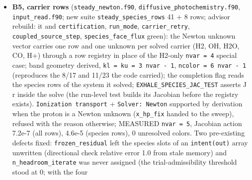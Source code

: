 \documentclass[english,a4paper]{my_memo}
\begin{document}
\begin{itemize}
  lines, b1a 127, b1 64, b3b 24, a2 7, a0 5, b3a 5, b4 2) re-anchored to
  file + routine, declaration or labeled comment block, read against the
  live tree; the step tables of d0 6.1 and b1 7.1 index by the \texttt{as\_op\_*}
  operation tag of \texttt{attempted\_step.f90}; the convention is stated in each
  document. Citations of removed code (the composition projection, the
  two-iteration energy update, the CO ceiling, the cell-velocity carrier
  advection, the element advective term, DB96 eq. (39), the H3+ clamp, the
  second H2 partition function) kept as dated records naming the removing
  item. Stale values corrected in passing: \texttt{e\_lw\_photon\_erg} 1.88021e-11 erg
  (11.7354 eV) over 912-1201 A, \texttt{binary\_element\_diffusion.f90} 3037 lines,
  a2 section 1\textquotesingle s chemical count now passed by the marching caller. All 190
  names introduced grepped present in \texttt{src/}. Recorded: pre-existing
  markdown table pipe misalignments (unescaped \texttt{\textbar{}} in math) in a2, b4,
  code\_status, d0; two markdown line citations of
  \texttt{grid\_and\_gates/README.md} left.
\item
  \textbf{B5, carrier rows} (\texttt{steady\_newton.f90}, \texttt{diffusive\_photochemistry.f90},
  \texttt{input\_read.f90}; new suite \texttt{steady\_species\_rows} 41 + 8 rows; advisor
  rebuild: it and \texttt{certification}, \texttt{run\_mode}, \texttt{carrier\_retry},
  \texttt{coupled\_source\_step}, \texttt{species\_face\_flux} green): the Newton unknown
  vector carries one row and one unknown per solved carrier (H2, OH, H2O,
  CO, H+) through a row registry in place of the H2-only \texttt{nvar\ =\ 4} special
  case; band geometry derived, \texttt{kl\ =\ ku\ =\ 3\ nvar\ -\ 1}, \texttt{ncolor\ =\ 6\ nvar\ -\ 1}
  (reproduces the 8/17 and 11/23 the code carried); the completion flag
  reads the species rows of the system it solved; \texttt{EXHALE\_SPECIES\_JAC\_TEST}
  asserts J r inside the solve (the run-level test builds its Jacobian
  before the registry exists). \texttt{Ionization\ transport} + \texttt{Solver:\ Newton}
  supported by derivation when the proton is a Newton unknown (\texttt{x\_hp\_fix}
  handed to the sweep), refused with the reason otherwise; MEASURED
  \texttt{nvar\ =\ 5}, Jacobian action 7.2e-7 (all rows), 4.6e-5 (species rows), 0
  unresolved colors. Two pre-existing defects fixed: \texttt{frozen\_residual} left
  the species slots of an \texttt{intent(out)} array unwritten (directional check
  relative error 1.0 from stale memory) and \texttt{n\_headroom\_iterate} was never
  assigned (the trial-admissibility threshold stood at 0; with the four

\end{itemize}
\end{document}
